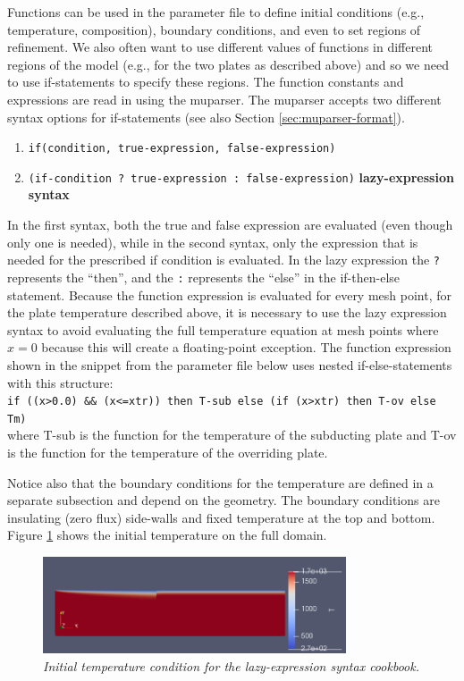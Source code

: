 \documentclass{article}
\begin{document}
Functions can be used in the parameter file to define initial conditions (e.g., temperature, composition), boundary conditions, and even to set regions of refinement. We also often want to use different values of functions in different regions of the model (e.g., for the two plates as described above) and so we need to use if-statements to specify these regions. The function constants and expressions are read in using the muparser. The muparser accepts two different syntax options for if-statements (see also Section \ref{sec:muparser-format}).
\begin{enumerate}
\item \texttt{if(condition, true-expression, false-expression)}
\item \texttt{(if-condition ?\ true-expression :\ false-expression)}  \textbf{lazy-expression syntax}
\end{enumerate}
In the first syntax, both the true and false expression are evaluated (even though only one is needed), while in the second  syntax, only the expression that is needed for the prescribed if condition is evaluated. In the lazy expression the \texttt{?} represents the ``then'', and the \texttt{:} represents the ``else'' in the if-then-else statement. Because the function expression is evaluated for every mesh point, for the plate temperature described above, it is necessary to use the lazy expression syntax to avoid evaluating the full temperature equation at mesh points where $x=0$ because this will create a floating-point exception.  The function expression shown in the snippet from the parameter file below uses nested if-else-statements with this structure:\\
\texttt{if ((x>0.0) \&\& (x<=xtr))  then T-sub else (if (x>xtr) then T-ov else Tm)}\\
where T-sub is the function for the temperature of the subducting plate and T-ov is the function for the temperature of the
overriding plate.

Notice also that the boundary conditions for the temperature are defined in a separate subsection and depend on the geometry.
The boundary conditions are insulating (zero flux) side-walls and fixed temperature at the top and bottom. Figure \ref{lazy-expression-tempic} shows the initial temperature on the full domain.
\begin{figure}
\centering
\includegraphics[width=0.8\textwidth]{cookbooks/muparser-temperature-example/initial_temperature.png}
\caption{\it Initial temperature condition for the lazy-expression syntax cookbook. \label{lazy-expression-tempic}}
\end{figure}
\end{document}
